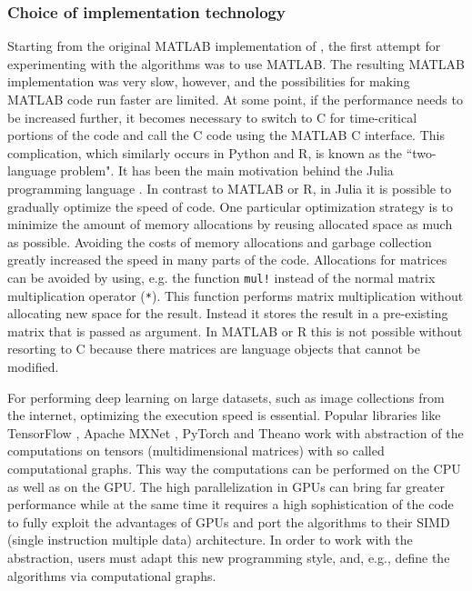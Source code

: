 \documentclass[12pt]{article}
\newcommand{\inlinecode}[1]{\texttt{#1}}
\begin{document}
\subsubsection{Choice of implementation technology}
Starting from the original MATLAB implementation of \cite{hinton_reducing_2006}, the first attempt for experimenting with the algorithms was to use MATLAB.
The resulting MATLAB implementation was very slow, however, and the possibilities for making MATLAB code run faster are limited.
At some point, if the performance needs to be increased further,  it becomes necessary to switch to C for time-critical portions of the code and call the C code using the MATLAB C interface.
This complication, which similarly occurs in Python and R, is known as the ``two-language problem". 
It has been the main motivation behind the Julia programming language \citep{bezanson2017julia}.
In contrast to MATLAB or R, in Julia it is possible to gradually optimize the speed of code.
One particular optimization strategy is to minimize the amount of memory allocations by reusing allocated space as much as possible.
Avoiding the costs of memory allocations and garbage collection greatly increased the speed in many parts of the code.
Allocations for matrices can be avoided by using, e.g. the function \inlinecode{mul!} instead of the normal matrix multiplication operator (\inlinecode{*}).
This function performs matrix multiplication without allocating new space for the result.
Instead it stores the result in a pre-existing matrix that is passed as argument.
In MATLAB or R this is not possible without resorting to C because there matrices are language objects that cannot be modified.

For performing deep learning on large datasets, such as image collections from the internet, optimizing the execution speed is essential.
Popular libraries like TensorFlow \citep{abadi2016tensorflow}, Apache MXNet \citep{mxnet}, PyTorch \citep{pytorch} and Theano \citep{theano}
work with abstraction of the computations on tensors (multidimensional matrices) with so called computational graphs.
This way the computations can be performed on the CPU as well as on the GPU.
The high parallelization in GPUs can bring far greater performance while at the same time it requires a high sophistication of the code to fully exploit the advantages of GPUs and port the algorithms to their SIMD (single instruction multiple data) architecture.
In order to work with the abstraction, users must adapt this new programming style, and, e.g., define the algorithms via computational graphs.
\end{document}
